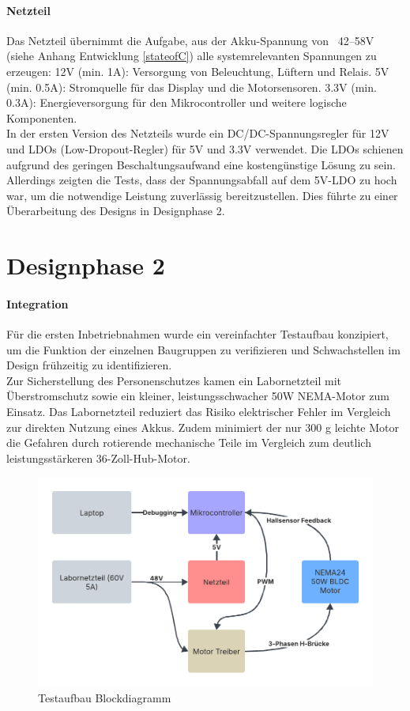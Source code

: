 \documentclass[paper=a4,11pt]{scrreprt}
\begin{document}
\paragraph{Netzteil}
Das Netzteil übernimmt die Aufgabe, aus der Akku-Spannung von ~42–58V (siehe Anhang Entwicklung \ref{stateofC}) alle systemrelevanten Spannungen zu erzeugen:
12V (min. 1A): Versorgung von Beleuchtung, Lüftern und Relais.
5V (min. 0.5A): Stromquelle für das Display und die Motorsensoren.
3.3V (min. 0.3A): Energieversorgung für den Mikrocontroller und weitere logische Komponenten.\\
In der ersten Version des Netzteils wurde ein DC/DC-Spannungsregler für 12V und LDOs (Low-Dropout-Regler) für 5V und 3.3V verwendet. Die LDOs schienen aufgrund des geringen Beschaltungsaufwand eine kostengünstige Lösung zu sein.
Allerdings zeigten die Tests, dass der Spannungsabfall auf dem 5V-LDO zu hoch war, um die notwendige Leistung zuverlässig bereitzustellen. Dies führte zu einer Überarbeitung des Designs in Designphase 2.
\section{Designphase 2}
\paragraph{Integration}
Für die ersten Inbetriebnahmen wurde ein vereinfachter Testaufbau konzipiert, um die Funktion der einzelnen Baugruppen zu verifizieren und Schwachstellen im Design frühzeitig zu identifizieren.\\
Zur Sicherstellung des Personenschutzes kamen ein Labornetzteil mit Überstromschutz sowie ein kleiner, leistungsschwacher 50W NEMA-Motor zum Einsatz. Das Labornetzteil reduziert das Risiko elektrischer Fehler im Vergleich zur direkten Nutzung eines Akkus. Zudem minimiert der nur 300 g leichte Motor die Gefahren durch rotierende mechanische Teile im Vergleich zum deutlich leistungsstärkeren 36-Zoll-Hub-Motor.
\begin{figure}[ht]
\begin{center}
\includegraphics[width=12cm]{Bilder/Labortest.PNG}
\caption{Testaufbau Blockdiagramm}
\label{labtest}
\end{center}
\end{figure}
\newpage
\end{document}
